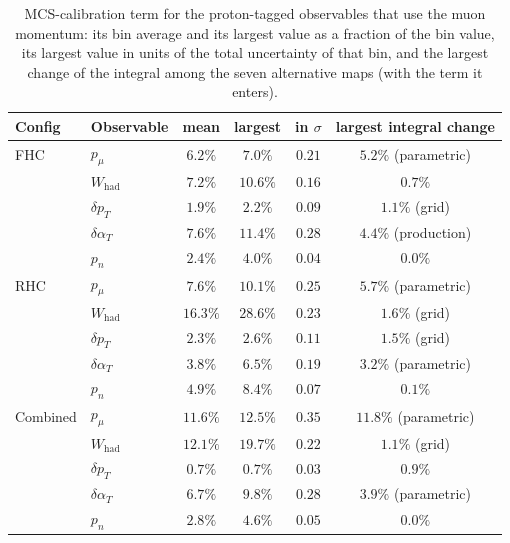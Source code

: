 \documentclass[11pt,a4paper]{article}
\begin{document}
\begin{table}[H]
  \centering
  \caption{MCS-calibration term for the proton-tagged observables that use the muon momentum: its bin average and its
    largest value as a fraction of the bin value, its largest value in units of the total uncertainty of that bin, and
    the largest change of the integral among the seven alternative maps (with the term it enters).}
  \label{tab:pt_mcs}
  \small
  \begin{tabular}{llcccc}
    \toprule
    Config & Observable & mean & largest & in $\sigma$ & largest integral change \\
    \midrule
    FHC      & $p_\mu$ & $6.2\%$ & $7.0\%$ & $0.21$ & $5.2\%$ (parametric) \\
             & $W_\mathrm{had}$ & $7.2\%$ & $10.6\%$ & $0.16$ & $0.7\%$ \\
             & $\delta p_T$ & $1.9\%$ & $2.2\%$ & $0.09$ & $1.1\%$ (grid) \\
             & $\delta\alpha_T$ & $7.6\%$ & $11.4\%$ & $0.28$ & $4.4\%$ (production) \\
             & $p_n$ & $2.4\%$ & $4.0\%$ & $0.04$ & $0.0\%$ \\
    \midrule
    RHC      & $p_\mu$ & $7.6\%$ & $10.1\%$ & $0.25$ & $5.7\%$ (parametric) \\
             & $W_\mathrm{had}$ & $16.3\%$ & $28.6\%$ & $0.23$ & $1.6\%$ (grid) \\
             & $\delta p_T$ & $2.3\%$ & $2.6\%$ & $0.11$ & $1.5\%$ (grid) \\
             & $\delta\alpha_T$ & $3.8\%$ & $6.5\%$ & $0.19$ & $3.2\%$ (parametric) \\
             & $p_n$ & $4.9\%$ & $8.4\%$ & $0.07$ & $0.1\%$ \\
    \midrule
    Combined & $p_\mu$ & $11.6\%$ & $12.5\%$ & $0.35$ & $11.8\%$ (parametric) \\
             & $W_\mathrm{had}$ & $12.1\%$ & $19.7\%$ & $0.22$ & $1.1\%$ (grid) \\
             & $\delta p_T$ & $0.7\%$ & $0.7\%$ & $0.03$ & $0.9\%$ \\
             & $\delta\alpha_T$ & $6.7\%$ & $9.8\%$ & $0.28$ & $3.9\%$ (parametric) \\
             & $p_n$ & $2.8\%$ & $4.6\%$ & $0.05$ & $0.0\%$ \\
    \bottomrule
  \end{tabular}
\end{table}

\
\end{document}
